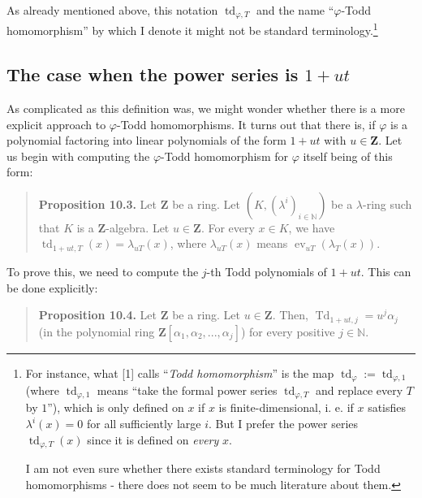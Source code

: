 \documentclass[numbers=enddot,12pt,final,onecolumn,notitlepage]{scrartcl}%
\begin{document}
As already mentioned above, this notation $\operatorname*{td}%
\nolimits_{\varphi,T}$ and the name ``$\varphi$-Todd homomorphism'' by which I
denote it might not be standard terminology.\footnote{For instance, what [1]
calls ``\textit{Todd homomorphism}'' is the map $\operatorname*{td}_{\varphi
}:=\operatorname*{td}\nolimits_{\varphi,1}$ (where $\operatorname*{td}%
\nolimits_{\varphi,1}$ means ``take the formal power series $\operatorname*{td}%
\nolimits_{\varphi,T}$ and replace every $T$ by $1$''), which is only defined
on $x$ if $x$ is finite-dimensional, i. e. if $x$ satisfies $\lambda
^{i}\left(  x\right)  =0$ for all sufficiently large $i.$ But I prefer the
power series $\operatorname*{td}\nolimits_{\varphi,T}\left(  x\right)  $ since
it is defined on \textit{every }$x$.
\par
I am not even sure whether there exists standard terminology for Todd
homomorphisms - there does not seem to be much literature about them.}

\subsection{The case when the power series is $1+ut$}

As complicated as this definition was, we might wonder whether there is a more
explicit approach to $\varphi$-Todd homomorphisms. It turns out that there is,
if $\varphi$ is a polynomial factoring into linear polynomials of the form
$1+ut$ with $u\in\mathbf{Z}$. Let us begin with computing the $\varphi$-Todd
homomorphism for $\varphi$ itself being of this form:

\begin{quote}
\textbf{Proposition 10.3.} Let $\mathbf{Z}$ be a ring. Let $\left(  K,\left(
\lambda^{i}\right)  _{i\in\mathbb{N}}\right)  $ be a $\lambda$-ring such that
$K$ is a $\mathbf{Z}$-algebra. Let $u\in\mathbf{Z}$. For every $x\in K$, we
have $\operatorname*{td}\nolimits_{1+ut,T}\left(  x\right)  =\lambda
_{uT}\left(  x\right)  $, where $\lambda_{uT}\left(  x\right)  $ means
$\operatorname*{ev}\nolimits_{uT}\left(  \lambda_{T}\left(  x\right)  \right)
$.
\end{quote}

To prove this, we need to compute the $j$-th Todd polynomials of $1+ut$. This
can be done explicitly:

\begin{quote}
\textbf{Proposition 10.4.} Let $\mathbf{Z}$ be a ring. Let $u\in\mathbf{Z}$.
Then, $\operatorname*{Td}\nolimits_{1+ut,j}=u^{j}\alpha_{j}$ (in the
polynomial ring $\mathbf{Z}\left[  \alpha_{1},\alpha_{2},...,\alpha
_{j}\right]  $) for every positive $j\in\mathbb{N}$.
\end{quote}
\end{document}
